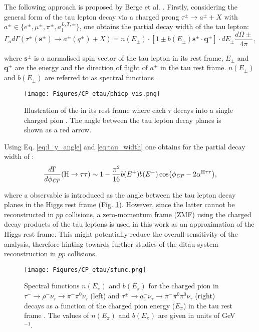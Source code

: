 The following approach is proposed by Berge et al. \cite{Berge:2011ij, Berge:2014sra, Berge:2014wta}. Firstly, considering the general form of the tau lepton decay via a charged prong $\tau^\pm \to a^\pm + X$ with $a^\pm \in \{e^\pm, \mu^\pm, \pi^\pm, a_1^{L,T,\pm}\}$, one obtains the partial decay width of the tau lepton:
\begin{equation}\label{eq:tau_width}
    \Gamma_ad\Gamma(\tau^\pm(\boldsymbol{s}^\pm) \to a^\pm(q^\pm)+X) = n(E_\pm)\cdot[1 \pm b(E_\pm) \boldsymbol{s}^\pm \cdot \boldsymbol{q}^\pm]\cdot dE_\pm\dfrac{d\Omega\pm}{4\pi},
\end{equation}

where $\boldsymbol{s}^\pm$ is a normalised spin vector of the tau lepton in its rest frame, $E_\pm$ and $\boldsymbol{q}^\pm$ are the energy and the direction of flight of $a^\pm$ in the tau rest frame. $n(E_\pm)$ and $b(E_\pm)$ are referred to as spectral functions \cite{Berge:2011ij}. 

\begin{figure}[t!]
    \centering
    \texttt{[image: Figures/CP\_etau/phicp\_vis.png]}
    \caption{Illustration of the \htt in its rest frame where each $\tau$ decays into a single charged pion \cite{CMS:2021sdq}. The \phicp angle between the tau lepton decay planes is shown as a red arrow.}
    \label{fig:phicp_vis}
\end{figure}

Using Eq. \ref{eq:l_y_angle} and \ref{eq:tau_width} one obtains for the partial decay width of \htt:
\begin{equation}\label{eq:master}
    \dfrac{d\Gamma}{d\phi_{\textit{CP}}}(\text{H} \rightarrow \tau\tau) \sim 1 - \dfrac{\pi^2}{16}b(E^+)b(E^-)\cos(\phi_{\textit{CP}} - 2\alpha^{\text{H}\tau\tau}),
\end{equation}

where a \phicp observable is introduced as the angle between the tau lepton decay planes in the Higgs rest frame (Fig. \ref{fig:phicp_vis}). However, since the latter cannot be reconstructed in $pp$ collisions, a zero-momentum frame (ZMF) using the charged decay products of the tau leptons is used in this work as an approximation of the Higgs rest frame. This might potentially reduce the overall sensitivity of the analysis, therefore hinting towards further studies of the ditau system reconstruction in $pp$ collisions.

\begin{figure}[t!]
    \centering
    \texttt{[image: Figures/CP\_etau/sfunc.png]}
    \caption{Spectral functions $n(E_\pi)$ and $b(E_\pi)$ for the charged pion in $\tau^- \to \rho^- \nu_\tau \to \pi^-\pi^0\nu_\tau$ (left) and $\tau^\pm \to a_1^- \nu_\tau \to \pi^-\pi^0\pi^0\nu_\tau$ (right) decays as a function of the charged pion energy ($E_\pi$) in the tau rest frame \cite{Berge:2011ij}. The values of $n(E_\pi)$ and $b(E_\pi)$ are given in units of GeV$^{-1}$.}
    \label{fig:sfunc}
\end{figure}


